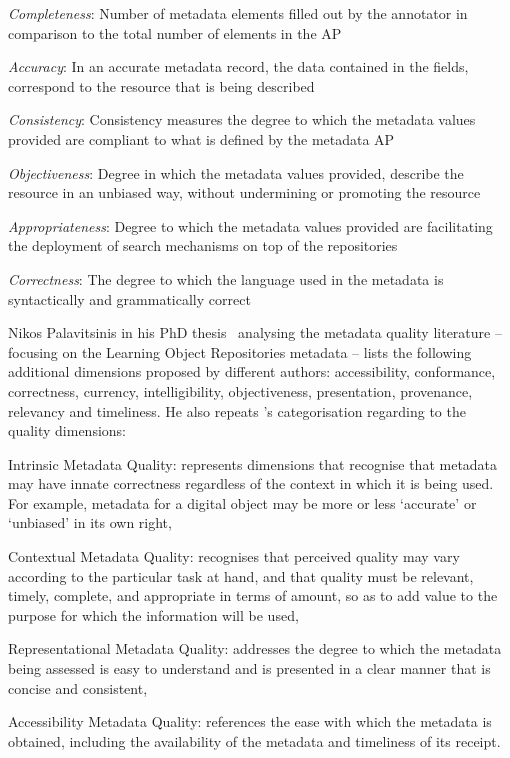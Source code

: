 \emph{Completeness}: Number of metadata elements filled out by the annotator in comparison to the total number of elements in the AP

\emph{Accuracy}: In an accurate metadata record, the data contained in the fields, correspond to the resource that is being described

\emph{Consistency}: Consistency measures the degree to which the metadata values provided are compliant to what is defined by the metadata AP

\emph{Objectiveness}: Degree in which the metadata values provided, describe the resource in an unbiased way, without undermining or promoting the resource

\emph{Appropriateness}: Degree to which the metadata values provided are facilitating the deployment of search mechanisms on top of the repositories

\emph{Correctness}: The degree to which the language used in the metadata is syntactically and grammatically correct

Nikos Palavitsinis in his PhD thesis~\cite{palavitsinis2014} analysing the metadata quality literature -- focusing on the Learning Object Repositories metadata -- lists the following additional dimensions proposed by different authors: accessibility, conformance, correctness, currency, intelligibility, objectiveness, presentation, provenance, relevancy and timeliness. He also repeats \cite{lee2002}’s categorisation regarding to the quality dimensions:

Intrinsic Metadata Quality: represents dimensions that recognise that metadata may have innate correctness regardless of the context in which it is being used. For example, metadata for a digital object may be more or less ‘accurate’ or ‘unbiased’ in its own right,

Contextual Metadata Quality: recognises that perceived quality may vary according to the particular task at hand, and that quality must be relevant, timely, complete, and appropriate in terms of amount, so as to add value to the purpose for which the information will be used,

Representational Metadata Quality: addresses the degree to which the metadata being assessed is easy to understand and is presented in a clear manner that is concise and consistent,

Accessibility Metadata Quality: references the ease with which the metadata is obtained, including the availability of the metadata and timeliness of its receipt.

